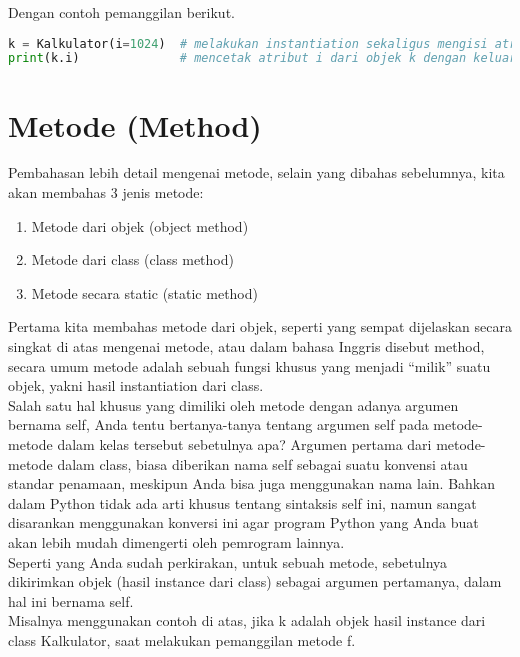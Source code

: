 Dengan contoh pemanggilan berikut.

\begin{lstlisting}[language=Python]
k = Kalkulator(i=1024)  # melakukan instantiation sekaligus mengisi atribut i jadi 1024
print(k.i)              # mencetak atribut i dari objek k dengan keluaran nilai 1024
\end{lstlisting}

\section{Metode (Method)}
Pembahasan lebih detail mengenai metode, selain yang dibahas sebelumnya, kita akan membahas 3 jenis metode:
\begin{enumerate}
\item Metode dari objek (object method)

\item Metode dari class (class method)

\item Metode secara static (static method)
\end{enumerate}

Pertama kita membahas metode dari objek, seperti yang sempat dijelaskan secara singkat di atas mengenai metode, atau dalam bahasa Inggris disebut method, secara umum metode adalah sebuah fungsi khusus yang menjadi “milik” suatu objek, yakni hasil instantiation dari class.\\

Salah satu hal khusus yang dimiliki oleh metode dengan adanya argumen bernama self, Anda tentu bertanya-tanya tentang argumen self pada metode-metode dalam kelas tersebut sebetulnya apa?
Argumen pertama dari metode-metode dalam class, biasa diberikan nama self sebagai suatu konvensi atau standar penamaan, meskipun Anda bisa juga menggunakan nama lain. Bahkan dalam Python tidak ada arti khusus tentang sintaksis self ini, namun sangat disarankan menggunakan konversi ini agar program Python yang Anda buat akan lebih mudah dimengerti oleh pemrogram lainnya. \\
Seperti yang Anda sudah perkirakan, untuk sebuah metode, sebetulnya dikirimkan objek (hasil instance dari class) sebagai argumen pertamanya, dalam hal ini bernama self.\\

Misalnya menggunakan contoh di atas, jika k adalah objek hasil instance dari class Kalkulator, saat melakukan pemanggilan metode f.\\

